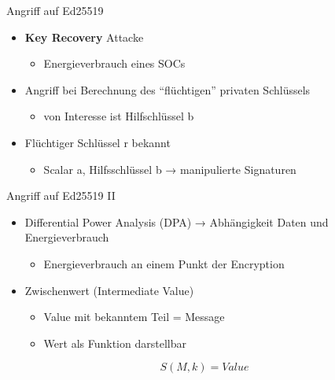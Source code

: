 \documentclass[
  11 pt,
  ignorenonframetext,
  aspectratio=43,
]{beamer}
\providecommand{\tightlist}{%
  \setlength{\itemsep}{0pt}\setlength{\parskip}{0pt}}
\begin{document}
\begin{frame}{Angriff auf Ed25519}
\protect\hypertarget{angriff-auf-ed25519}{}
\begin{itemize}
\tightlist
\item
  \textbf{Key Recovery} Attacke

  \begin{itemize}
  \tightlist
  \item
    Energieverbrauch eines SOCs
  \end{itemize}
\end{itemize}

\pause

\begin{itemize}
\tightlist
\item
  Angriff bei Berechnung des ``flüchtigen'' privaten Schlüssels

  \begin{itemize}
  \tightlist
  \item
    von Interesse ist Hilfschlüssel b
  \end{itemize}
\end{itemize}

\pause

\begin{itemize}
\tightlist
\item
  Flüchtiger Schlüssel r bekannt

  \begin{itemize}
  \tightlist
  \item
    Scalar a, Hilfsschlüssel b → manipulierte Signaturen
  \end{itemize}
\end{itemize}
\end{frame}

\begin{frame}{Angriff auf Ed25519 II}
\protect\hypertarget{angriff-auf-ed25519-ii}{}
\begin{itemize}
\tightlist
\item
  Differential Power Analysis (DPA) → Abhängigkeit Daten und
  Energieverbrauch

  \begin{itemize}
  \tightlist
  \item
    Energieverbrauch an einem Punkt der Encryption
  \end{itemize}
\end{itemize}

\pause

\begin{itemize}
\tightlist
\item
  Zwischenwert (Intermediate Value)

  \begin{itemize}
  \tightlist
  \item
    Value mit bekanntem Teil = Message
  \item
    Wert als Funktion darstellbar
  \end{itemize}
\end{itemize}

\pause

\[ S(M,k) = Value \]
\end{frame}
\end{document}
